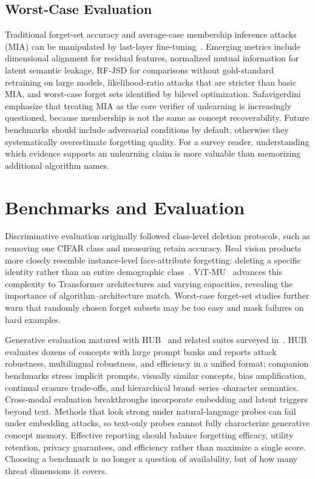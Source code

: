 \documentclass[10pt,twocolumn,letterpaper]{article}
\begin{document}
\subsection{Worst-Case Evaluation}

Traditional forget-set accuracy and average-case membership inference attacks (MIA) can be manipulated by last-layer fine-tuning~\cite{safavigerdini2026}. Emerging metrics include dimensional alignment for residual features, normalized mutual information for latent semantic leakage, RF-JSD for comparisons without gold-standard retraining on large models, likelihood-ratio attacks that are stricter than basic MIA, and worst-case forget sets identified by bilevel optimization. Safavigerdini~\etal~\cite{safavigerdini2026} emphasize that treating MIA as the core verifier of unlearning is increasingly questioned, because membership is not the same as concept recoverability. Future benchmarks should include adversarial conditions by default; otherwise they systematically overestimate forgetting quality. For a survey reader, understanding which evidence supports an unlearning claim is more valuable than memorizing additional algorithm names.

\section{Benchmarks and Evaluation}

Discriminative evaluation originally followed class-level deletion protocols, such as removing one CIFAR class and measuring retain accuracy. Real vision products more closely resemble instance-level face-attribute forgetting: deleting a specific identity rather than an entire demographic class~\cite{safavigerdini2026}. ViT-MU~\cite{zhao2026vit} advances this complexity to Transformer architectures and varying capacities, revealing the importance of algorithm--architecture match. Worst-case forget-set studies further warn that randomly chosen forget subsets may be too easy and mask failures on hard examples.

Generative evaluation matured with HUB~\cite{moon2025hub} and related suites surveyed in~\cite{safavigerdini2026}. HUB evaluates dozens of concepts with large prompt banks and reports attack robustness, multilingual robustness, and efficiency in a unified format; companion benchmarks stress implicit prompts, visually similar concepts, bias amplification, continual erasure trade-offs, and hierarchical brand--series--character semantics. Cross-modal evaluation breakthroughs incorporate embedding and latent triggers beyond text. Methods that look strong under natural-language probes can fail under embedding attacks, so text-only probes cannot fully characterize generative concept memory. Effective reporting should balance forgetting efficacy, utility retention, privacy guarantees, and efficiency rather than maximize a single score. Choosing a benchmark is no longer a question of availability, but of how many threat dimensions it covers.
\end{document}
